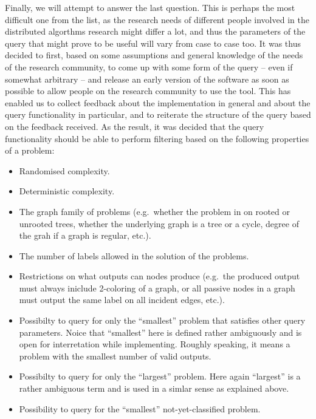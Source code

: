 Finally, we will attempt to answer the last question.
This is perhaps the most difficult one from the list,
as the research needs of different people involved in
the distributed algorthms research might differ a lot, and thus
the parameters of the query that might prove to be useful
will vary from case to case too. It was thus decided to first,
based on some assumptions and general knowledge of the
needs of the research community, to come up with some form of the
query -- even if somewhat arbitrary -- and release an early version
of the software as soon as possible to allow people on the
research community to use the tool. This has enabled us to
collect feedback about the implementation in general and about the
query functionality in particular, and to reiterate the structure of
the query based on the feedback received. As the result, it was
decided that the query functionality should be able to perform
filtering based on the following properties of a problem:

\begin{itemize}
  \item Randomised complexity.
  \item Deterministic complexity.
  \item The graph family of problems (e.g.~whether the problem in on
  rooted or unrooted trees, whether the underlying graph is a tree
  or a cycle, degree of the grah if a graph is regular, etc.).
  \item The number of labels allowed in the solution of the problems.
  \item Restrictions on what outputs can nodes produce (e.g.~the
  produced output must always iniclude 2-coloring of a graph,
  or all passive nodes in a graph must output the same
  label on all incident edges, etc.).
  \item Possibilty to query for only the ``smallest'' problem that
  satisfies other query parameters. Noice that ``smallest'' here is
  defined rather ambiguously and is open for interretation while implementing. Roughly speaking, it means a problem with the smallest
  number of valid outputs.
  \item Possibilty to query for only the ``largest'' problem. Here again
  ``largest'' is a rather ambiguous term and is used in a simlar sense
  as explained above.
  \item Possibility to query for the ``smallest'' not-yet-classified problem.
\end{itemize}
